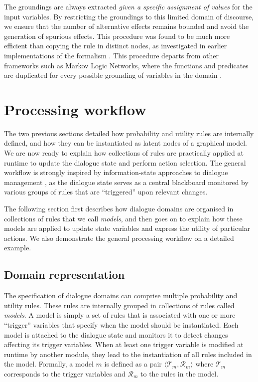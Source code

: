 The groundings are always extracted \textit{given a specific assignment of values} for the input variables. By restricting the groundings to this limited domain of discourse, we ensure that the number of alternative effects remains bounded and avoid the generation of spurious effects.   This procedure was found to be much more efficient than copying the rule in distinct nodes, as investigated in earlier implementations of the formalism \citep{relational-apl2012}.  This procedure departs from other frameworks such as Markov Logic Networks, where the functions and predicates are duplicated for every possible grounding of variables in the domain \citep{Richardson:2006}.



%

\section{Processing workflow}
\label{sec:processing-workflow}

The two previous sections detailed how probability and utility rules are internally defined, and how they can be instantiated as latent nodes of a graphical model. We are now ready to explain how collections of rules are practically applied at runtime to update the dialogue state and perform action selection. The general workflow is strongly inspired by information-state approaches to dialogue management \citep{Larsson:2000}, as the dialogue state serves as a central blackboard monitored by various groups of rules that are ``triggered'' upon relevant changes. 

The following section first describes how dialogue domains are organised in collections of rules that we call \textit{models}, and then goes on to explain how these models are applied to update state variables and express the utility of particular actions. We also demonstrate the general processing workflow on a detailed example. 


\subsection{Domain representation}

The specification of dialogue domains can comprise multiple probability and utility rules. These rules are internally grouped in collections of rules called \textit{models}. A model is simply a set of rules that is associated with one or more ``trigger'' variables that specify when the model should be instantiated. Each model is attached to the dialogue state and monitors it to detect changes affecting its trigger variables. When at least one trigger variable is modified at runtime by another module, they lead to the instantiation of all rules included in the model. Formally, a model $m$ is defined as a pair $\langle \mathcal{T}_m, \mathcal{R}_m \rangle$ where $\mathcal{T}_m$ corresponds to the trigger variables and $\mathcal{R}_m$ to the rules in the model.

